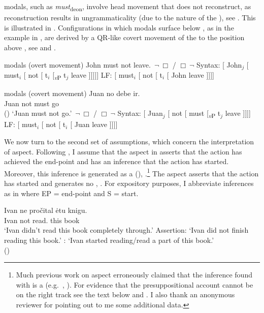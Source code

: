 \documentclass[output=paper,newtxmath,colorlinks,citecolor=brown]{langsci/langscibook}
\begin{document}
\noindent {} modals, such as  \textit{must}\textsubscript{deon}, involve head movement that does not reconstruct, as reconstruction results in ungrammaticality (due to the  nature of the ), see \cite[549]{iatzei13}.  This is illustrated in . Configurations in which  modals surface below , as in the  example in , are derived by a QR-like covert movement of the  to the position above , see  and .

	\ea {}  modals (overt movement) \label{overtmv}
		\ea John must not leave. \hfill {} $\,\neg \ \Box$ /  $\Box\ \neg$
		\ex Syntax: [ John$_j$ [ must$_i$ [ not [ t$_i$ [\textsubscript{\textit{v}P} t$_j$ leave ]]]]]
       	\ex LF: [ must$_i$ [ not [ t$_i$ [ John leave ]]]]
		\z \z

	\ea {}  modals (covert movement) \label{debe}
    	\ea \gll Juan no debe ir. \\
    	Juan not must go \\ \hfill ()
       	\glt `Juan must not go.' \hfill {} $\,\neg \ \Box$ /  $\Box\ \neg$ \label{spaa}
    	\ex Syntax: [ Juan$_j$ [ not [ must [\textsubscript{\textit{v}P} t$_j$ leave ]]]] \label{spab}
      	\ex LF: [ must$_i$ [ not [ t$_i$ [ Juan leave ]]]] \label{spac}
        \z \z

\noindent We now turn to the second set of assumptions, which concern the interpretation of  aspect. Following \citet{zinfil14}, I assume that the  aspect in  asserts that the action has achieved the end-point and has an inference that the action has started. Moreover, this inference is generated as a  (), .\footnote{Much previous work on  aspect erroneously claimed that the inference found with \p is a  (e.g.\ \citealt{bog85}, \citealt{rap85}). For evidence that the presuppositional account cannot be on the right track see the text below and \citet{zinfil14}. I also thank an anonymous reviewer for pointing out to me some additional data.
}
 The  aspect asserts that the action has started and generates no , . For expository purposes, I abbreviate  inferences as in  where EP = end-point and S = start.

\ea \label{pfv} \ea \gll Ivan ne pročital ėtu knigu. \\
    	Ivan not {read.\p} this book \\
        \glt `Ivan  didn't read this book completely through.'
        \ex  Assertion: `Ivan did not finish reading this book.'
   		\ex  {}: `Ivan started reading/read a part of this book.' \label{pfvsi} \\
        \hfill  (\citealt[383]{zinfil14})
	\z \z
\end{document}
